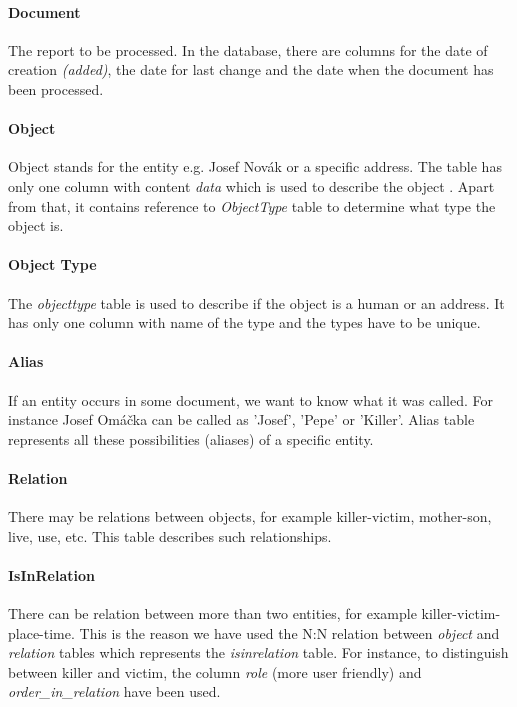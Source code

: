 \paragraph{Document} The report to be processed. In the database, there are
columns for the date of  creation \emph{(added)}, the date for last change and the date when the document has been processed.

\paragraph{Object} Object stands for the entity e.g. Josef Novák or a specific
address.  The table has only one column with content \emph{data} which is used
to describe the object  . Apart
from that, it contains reference to \emph{ObjectType} table to determine what
type the object is.

\paragraph{Object Type} The \emph{objecttype} table is used to describe if the
object is a human or an address. It has only one column  with name of the type and the types have to be
unique.

\paragraph{Alias} If an entity occurs in some document, we want to know what it
was called. For instance Josef Omáčka can be called as 'Josef', 'Pepe' or
'Killer'. Alias table represents all these possibilities (aliases) 
of a specific entity.

\paragraph{Relation} There may be relations between objects, for example
killer-victim, mother-son, live, use, etc. This table describes such
relationships. 

\paragraph{IsInRelation} There can be relation between more than two entities,
for example  killer-victim-place-time. This is the reason we have used the N:N
relation  between \emph{object} and \emph{relation} tables which represents the
\emph{isinrelation} table. For instance, to distinguish between killer and
victim, the column \emph{role} (more user friendly) and
\emph{order\_{}in\_{}relation} have been used.

